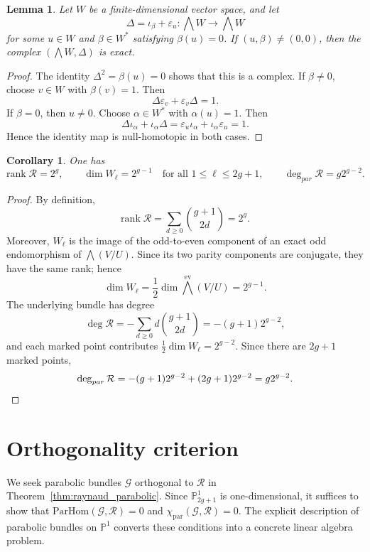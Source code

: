 \documentclass[12pt, letterpaper]{amsart}
\newtheorem{corollary}[theorem]{Corollary}
\newtheorem{lemma}[theorem]{Lemma}
\theoremstyle{definition}
\newcommand{\PP}{\mathbb{P} }
\newcommand{\cG}{\mathcal{G} }
\newcommand{\cR}{\mathcal{R} }
\newcommand{\pHom}{\mathrm{ParHom}}
\newcommand{\rpar}{\mathrm{par}}
\newcommand{\pardeg}{\deg_{par}}
\def\rank{\mathrm{rank}\;}
\begin{document}
\begin{lemma}\label{lem:exactness}
Let \(W\) be a finite-dimensional vector space, and let
\[\Delta=\iota_\beta+\varepsilon_u:\bigwedge W\longrightarrow \bigwedge W\]
for some \(u\in W\) and \(\beta\in W^*\) satisfying \(\beta(u)=0\). If \((u,\beta)\ne(0,0)\), then the complex \((\bigwedge W,\Delta)\) is exact.
\end{lemma}

\begin{proof}
The identity \(\Delta^2=\beta(u)=0\) shows that this is a complex. If \(\beta\ne0\), choose \(v\in W\) with \(\beta(v)=1\). Then
\[\Delta\varepsilon_v+\varepsilon_v\Delta=1.\]
If \(\beta=0\), then \(u\ne0\). Choose \(\alpha\in W^*\) with \(\alpha(u)=1\). Then
\[\Delta\iota_\alpha+\iota_\alpha\Delta=\varepsilon_u\iota_\alpha+\iota_\alpha\varepsilon_u=1.\]
Hence the identity map is null-homotopic in both cases.
\end{proof}

\begin{corollary}\label{cor:par_rk_deg}
One has
\[\rank\cR=2^g,\qquad\dim W_\ell=2^{g-1}\quad \text{for all }1\le\ell\le2g+1,\qquad\pardeg\cR=g2^{g-2}.\]
\end{corollary}

\begin{proof}
By definition,
\[\rank\cR=\sum_{d\ge0}\binom{g+1}{2d}=2^g.\]
Moreover, \(W_\ell\) is the image of the odd-to-even component of an exact odd endomorphism of \(\bigwedge(V/U)\). Since its two parity components are conjugate, they have the same rank; hence
\[\dim W_\ell=\frac12\dim\bigwedge^{\mathrm{ev}}(V/U)=2^{g-1}.\]
The underlying bundle has degree
\[\deg\cR=-\sum_{d\ge0} d\binom{g+1}{2d}=-(g+1)2^{g-2},\]
and each marked point contributes \(\frac12\dim W_\ell=2^{g-2}\). Since there are \(2g+1\) marked points,
\[\pardeg\cR=-(g+1)2^{g-2}+(2g+1)2^{g-2}=g2^{g-2}. \qedhere\]
\end{proof}

\section{Orthogonality criterion}\label{sec:orthogonality}

We seek parabolic bundles \(\cG\) orthogonal to \(\cR\) in Theorem~\ref{thm:raynaud_parabolic}. Since \(\PP_{2g+1}^1\) is one-dimensional, it suffices to show that \(\pHom(\cG, \cR) = 0\) and \(\chi_{\rpar}(\cG, \cR) = 0\). The explicit description of parabolic bundles on \(\PP^1\) converts these conditions into a concrete linear algebra problem.
\end{document}
